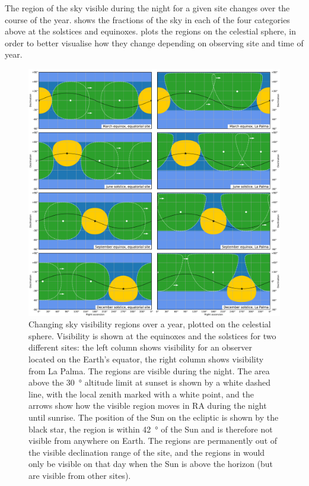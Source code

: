 \begin{colsection}
The region of the sky visible during the night for a given site changes over the course of the year.  shows the fractions of the sky in each of the four categories above at the solstices and equinoxes.  plots the regions on the celestial sphere, in order to better visualise how they change depending on observing site and time of year.

\begin{figure}[p]
    \begin{center}
        \includegraphics[width=\linewidth]{images/visibility.pdf}
    \end{center}
    \caption[Plotting sky visibility regions over a year]{
        Changing sky visibility regions over a year, plotted on the celestial sphere.
        Visibility is shown at the equinoxes and the solstices for two different sites: the left column shows visibility for an observer located on the Earth's equator, the right column shows visibility from La Palma. The  regions are visible during the night. The area above the \SI{30}{\degree} altitude limit at sunset is shown by a white dashed line, with the local zenith marked with a white point, and the arrows show how the visible region moves in RA during the night until sunrise. The position of the Sun on the ecliptic is shown by the black star, the  region is within \SI{42}{\degree} of the Sun and is therefore not visible from anywhere on Earth. The  regions are permanently out of the visible declination range of the site, and the regions in  would only be visible on that day when the Sun is above the horizon (but are visible from other sites).
    }\label{fig:visibility}
\end{figure}

\clearpage

\end{colsection}

